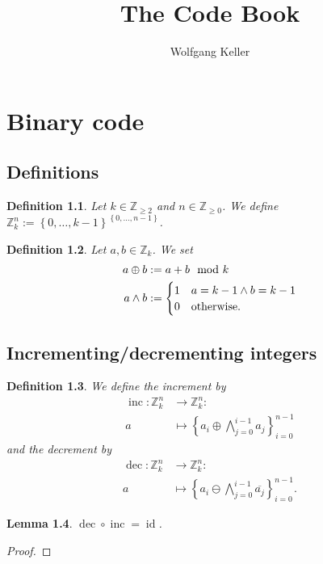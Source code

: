 \documentclass[10pt,a4paper,BCOR = 12mm,DIV=15]{scrbook}
\author{Wolfgang Keller}
\title{The Code Book}
\newtheorem{Def}{Definition}
\newtheorem{Le}[Def]{Lemma}
\newcommand{\id}{\operatorname{id}}
\newcommand{\inc}{\operatorname{inc}}
\newcommand{\dec}{\operatorname{dec}}
\begin{document}
\chapter{Binary code}

\section{Definitions}

\begin{Def}
Let $k \in \mathbb{Z}_{\geq 2}$ and $n \in \mathbb{Z}_{\geq 0}$. We define $\mathbb{Z}_k^n := \left\{0, \ldots, k-1\right\}^{\left\{0, \ldots, n-1\right\}}$.
\end{Def}

\begin{Def}
Let $a, b \in \mathbb{Z}_k$. We set
\begin{align*}
a \oplus b & := a + b \mod k \\
a \wedge b & := \begin{cases}
1 & a=k-1 \wedge b=k-1 \\
0 & \textnormal{otherwise.}
\end{cases}
\end{align*}
\end{Def}

\section{Incrementing/decrementing integers}

\begin{Def}
We define the \emph{increment} by
\begin{align*}
\inc: \mathbb{Z}_k^n & \rightarrow \mathbb{Z}_k^n: \\
a & \mapsto \left\{a_i \oplus \bigwedge_{j=0}^{i-1} a_j\right\}_{i=0}^{n-1}
\end{align*}
and the \emph{decrement} by
\begin{align*}
\dec: \mathbb{Z}_k^n & \rightarrow \mathbb{Z}_k^n: \\
a & \mapsto \left\{a_i \ominus \bigwedge_{j=0}^{i-1} \overline{a_j}\right\}_{i=0}^{n-1}.
\end{align*}
\end{Def}

\begin{Le}
$\dec \circ \inc = \id$.
\end{Le}
\begin{proof}

\end{proof}
\end{document}
